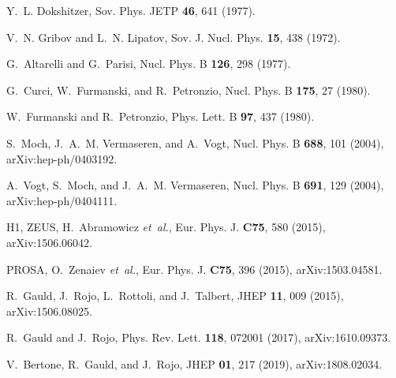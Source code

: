 \documentclass[12pt]{article}
\begin{document}

\clearpage
%
%
%

\begin{thebibliography}{99}

Y.~L. Dokshitzer,
\newblock Sov. Phys. JETP {\bf 46}, 641 (1977).

V.~N. Gribov and L.~N. Lipatov,
\newblock Sov. J. Nucl. Phys. {\bf 15}, 438 (1972).

G.~Altarelli and G.~Parisi,
\newblock Nucl. Phys. B {\bf 126}, 298 (1977).

G.~Curci, W.~Furmanski, and R.~Petronzio,
\newblock Nucl. Phys. B {\bf 175}, 27 (1980).

W.~Furmanski and R.~Petronzio,
\newblock Phys. Lett. B {\bf 97}, 437 (1980).

S.~Moch, J.~A.~M. Vermaseren, and A.~Vogt,
\newblock Nucl. Phys. B {\bf 688}, 101 (2004), arXiv:hep-ph/0403192.

A.~Vogt, S.~Moch, and J.~A.~M. Vermaseren,
\newblock Nucl. Phys. B {\bf 691}, 129 (2004), arXiv:hep-ph/0404111.

H1, ZEUS, H.~Abramowicz {\em et~al.},
\newblock Eur. Phys. J. {\bf C75}, 580 (2015), arXiv:1506.06042.

PROSA, O.~Zenaiev {\em et~al.},
\newblock Eur. Phys. J. {\bf C75}, 396 (2015), arXiv:1503.04581.

R.~Gauld, J.~Rojo, L.~Rottoli, and J.~Talbert,
\newblock JHEP {\bf 11}, 009 (2015), arXiv:1506.08025.

R.~Gauld and J.~Rojo,
\newblock Phys. Rev. Lett. {\bf 118}, 072001 (2017), arXiv:1610.09373.

V.~Bertone, R.~Gauld, and J.~Rojo,
\newblock JHEP {\bf 01}, 217 (2019), arXiv:1808.02034.


\end{thebibliography}
\end{document}
